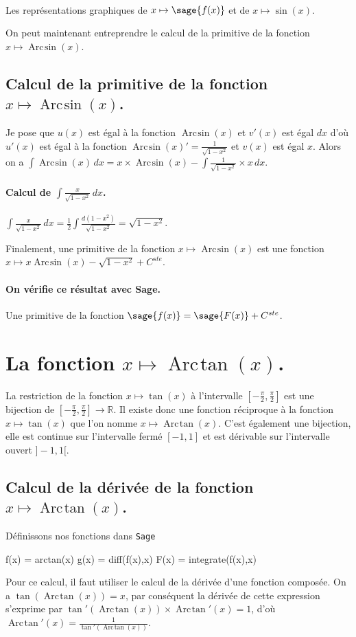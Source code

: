 \documentclass[a4paper,landscape,17pt]{extreport} %
\def\eclaire{\mathbb}
\def\R{\ensuremath{\eclaire R}}
\renewcommand{\arcsin}{\mathop{\mathrm{Arc\mspace{2mu}sin}}}
\renewcommand{\arctan}{\mathop{\mathrm{Arc\mspace{2mu}tan}}}
\begin{document}
\begin{center}
\\
Les représentations graphiques de $x \mapsto \sage{f(x)} $ et de $x\mapsto \sin(x)$.
\end{center}
On peut maintenant entreprendre le calcul de la primitive de la  fonction  $x \mapsto \arcsin(x) $.

\subsection{Calcul de la primitive de la fonction  $x \mapsto \arcsin(x) $.}
Je pose que $u(x)$  est égal à la fonction $\arcsin(x)$ et $v'(x)$ est égal $dx$  d'où $u'(x)$  est égal à la fonction $\arcsin(x) ' = \frac{1}{\sqrt{1- x^2}} $ et $v(x)$ est égal $x$.
Alors on a $\int \arcsin(x) \, dx = x \times \arcsin(x) -\int \frac{1}{\sqrt{1- x^2}} \times x \, dx $.


\paragraph{Calcul de $\int \frac{x}{\sqrt{1- x^2}} \, dx $.}
$\int \frac{x}{\sqrt{1- x^2}} \, dx = \frac{1}{2} \int \frac{d(1-x^2)}{\sqrt{1- x^2}}= \sqrt{1- x^2} $.

Finalement, une primitive de la fonction $x \mapsto \arcsin(x) $ est une fonction  $ x \mapsto x \arcsin(x) - \sqrt{1- x^2} + C^{ste} $.
\paragraph{On vérifie ce résultat avec Sage.}
Une primitive de la fonction $\sage{f(x)} = \sage{F(x)} + C^{ste}$.


\section{La fonction  $x \mapsto \arctan(x) $.}
La restriction de la fonction $x \mapsto \tan(x) $ à l'intervalle $\left[-\frac{\pi}{2},\frac{\pi}{2}\right]$ est une bijection de $\left[-\frac{\pi}{2},\frac{\pi}{2}\right] \rightarrow \R $. Il existe donc une fonction réciproque à la fonction $x \mapsto \tan(x) $ que l'on nomme $x \mapsto \arctan(x) $. C'est également une bijection, elle est continue sur l'intervalle fermé  $ [-1,1]$ et est dérivable sur l'intervalle ouvert $]-1,1[$.


\subsection{Calcul de la dérivée de la fonction $x \mapsto \arctan(x) $.}
Définissons nos fonctions dans {\texttt{Sage}}
\begin{sageblock}
    f(x) = arctan(x)
    g(x) = diff(f(x),x)
    F(x) = integrate(f(x),x)
\end{sageblock}
Pour ce calcul, il faut utiliser le calcul de la dérivée d'une fonction composée. On a $\tan(\arctan(x))=x$, par conséquent la dérivée de cette expression s'exprime par $ \tan'(\arctan(x)) \times \arctan\nolimits'(x) = 1$, d'où $\arctan\nolimits'(x) = \frac{1}{\tan'(\arctan(x))} $.
\end{document}
